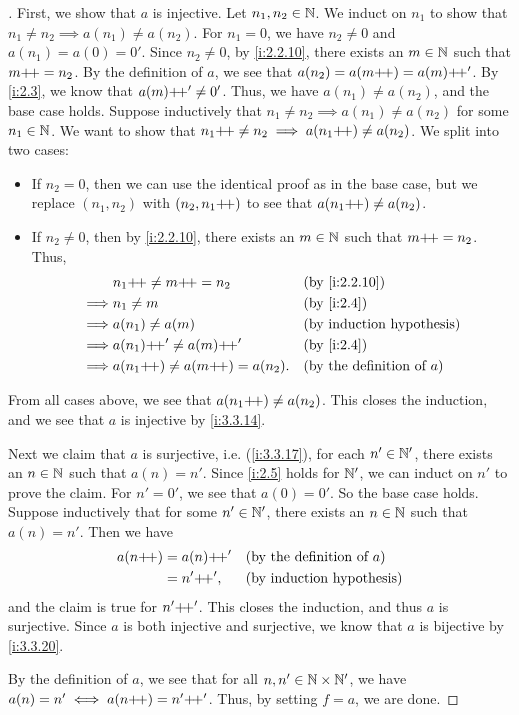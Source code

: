 \begin{proof}[]
  First, we show that \(a\) is injective.
  Let \(n_1, n_2 \in \mathbb{N}\).
  We induct on \(n_1\) to show that \(n_1 \neq n_2 \implies a(n_1) \neq a(n_2)\).
  For \(n_1 = 0\), we have \(n_2 \neq 0\) and \(a(n_1) = a(0) = 0'\).
  Since \(n_2 \neq 0\), by \cref{i:2.2.10}, there exists an \(m \in \mathbb{N}\) such that \(m{+}\!{+} = n_2\).
  By the definition of \(a\), we see that \(a(n_2) = a(m{+}\!{+}) = a(m){+}\!{+}'\).
  By \cref{i:2.3}, we know that \(a(m){+}\!{+}' \neq 0'\).
  Thus, we have \(a(n_1) \neq a(n_2)\), and the base case holds.
  Suppose inductively that \(n_1 \neq n_2 \implies a(n_1) \neq a(n_2)\) for some \(n_1 \in \mathbb{N}\).
  We want to show that \(n_1{+}\!{+} \neq n_2 \implies a(n_1{+}\!{+}) \neq a(n_2)\).
  We split into two cases:
  \begin{itemize}
    \item If \(n_2 = 0\), then we can use the identical proof as in the base case, but we replace \((n_1, n_2)\) with \((n_2, n_1{+}\!{+})\) to see that \(a(n_1{+}\!{+}) \neq a(n_2)\).
    \item If \(n_2 \neq 0\), then by \cref{i:2.2.10}, there exists an \(m \in \mathbb{N}\) such that \(m{+}\!{+} = n_2\).
          Thus,
          \begin{align*}
                     & n_1\pp \neq m\pp = n_2           &  & \by{i:2.2.10}                       \\
            \implies & n_1 \neq m                       &  & \by{i:2.4}                          \\
            \implies & a(n_1) \neq a(m)                 &  & \byIH                               \\
            \implies & a(n_1)\pp' \neq a(m)\pp'         &  & \by{i:2.4}                          \\
            \implies & a(n_1\pp) \neq a(m\pp) = a(n_2). &  & \text{(by the definition of \(a\))}
          \end{align*}
  \end{itemize}
  From all cases above, we see that \(a(n_1{+}\!{+}) \neq a(n_2)\).
  This closes the induction, and we see that \(a\) is injective by \cref{i:3.3.14}.

  Next we claim that \(a\) is surjective, i.e. (\cref{i:3.3.17}), for each \(n' \in \mathbb{N}'\), there exists an \(n \in \mathbb{N}\) such that \(a(n) = n'\).
  Since \cref{i:2.5} holds for \(\mathbb{N}'\), we can induct on \(n'\) to prove the claim.
  For \(n' = 0'\), we see that \(a(0) = 0'\).
  So the base case holds.
  Suppose inductively that for some \(n' \in \mathbb{N}'\), there exists an \(n \in \mathbb{N}\) such that \(a(n) = n'\).
  Then we have
  \begin{align*}
    a(n{+}\!{+}) & = a(n){+}\!{+}' &  & \text{(by the definition of \(a\))} \\
            & = n'{+}\!{+}',  &  & \text{(by induction hypothesis)}
  \end{align*}
  and the claim is true for \(n'{+}\!{+}'\).
  This closes the induction, and thus \(a\) is surjective.
  Since \(a\) is both injective and surjective, we know that \(a\) is bijective by \cref{i:3.3.20}.

  By the definition of \(a\), we see that for all \(n, n' \in \mathbb{N} \times \mathbb{N}'\), we have \(a(n) = n' \iff a(n{+}\!{+}) = n'{+}\!{+}'\).
  Thus, by setting \(f = a\), we are done.
\end{proof}
